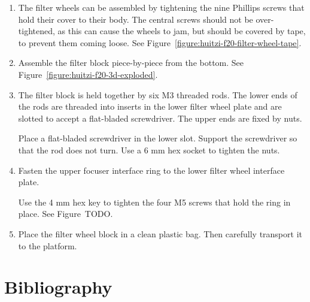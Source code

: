\begin{enumerate}

 \item The filter wheels can be assembled by tightening the nine Phillips screws that hold their cover to their body. The central screws should not be over-tightened, as this can cause the wheels to jam, but should be covered by tape, to prevent them coming loose. See Figure~\ref{figure:huitzi-f20-filter-wheel-tape}.
 
  \item Assemble the filter block piece-by-piece from the bottom. See Figure~\ref{figure:huitzi-f20-3d-exploded}.

  \item The filter block is held together by six M3 threaded rods. The lower ends of the rods are threaded into inserts in the lower filter wheel plate and are slotted to accept a flat-bladed screwdriver. The upper ends are fixed by nuts.
  
  Place a flat-bladed screwdriver in the lower slot. Support the screwdriver so that the rod does not turn. Use a 6 mm hex socket to tighten the nuts.
  
   \item Fasten the upper focuser interface ring to the lower filter wheel interface plate. 
   
   Use the 4 mm hex key to tighten the four M5 screws that hold the ring in place. See Figure~TODO.
   
   \item Place the filter wheel block in a clean plastic bag. Then carefully transport it to the platform.
  
\end{enumerate}


\section{Bibliography}

